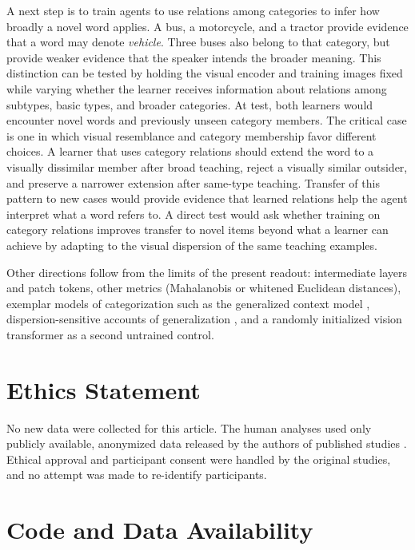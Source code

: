 \documentclass[11pt]{article}
\begin{document}
A next step is to train agents to use relations among categories to infer how broadly a novel word applies. A bus, a motorcycle, and a tractor provide evidence that a word may denote \emph{vehicle}. Three buses also belong to that category, but provide weaker evidence that the speaker intends the broader meaning. This distinction can be tested by holding the visual encoder and training images fixed while varying whether the learner receives information about relations among subtypes, basic types, and broader categories. At test, both learners would encounter novel words and previously unseen category members. The critical case is one in which visual resemblance and category membership favor different choices. A learner that uses category relations should extend the word to a visually dissimilar member after broad teaching, reject a visually similar outsider, and preserve a narrower extension after same-type teaching. Transfer of this pattern to new cases would provide evidence that learned relations help the agent interpret what a word refers to. A direct test would ask whether training on category relations improves transfer to novel items beyond what a learner can achieve by adapting to the visual dispersion of the same teaching examples.

Other directions follow from the limits of the present readout: intermediate layers and patch tokens, other metrics (Mahalanobis or whitened Euclidean distances), exemplar models of categorization such as the generalized context model \parencite{nosofsky1986}, dispersion-sensitive accounts of generalization \parencite{tenenbaum2001}, and a randomly initialized vision transformer as a second untrained control.

\section{Ethics Statement}

No new data were collected for this article. The human analyses used only publicly available, anonymized data released by the authors of published studies \parencite{lewis2018,hebart2023,roads2021,peterson2019,scott2019}. Ethical approval and participant consent were handled by the original studies, and no attempt was made to re-identify participants.

\section{Code and Data Availability}
\end{document}
